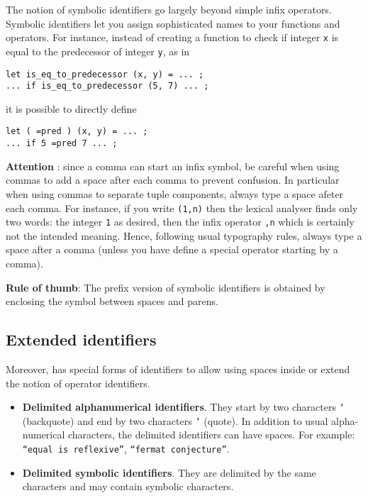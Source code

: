 The {\focal} notion of symbolic identifiers go largely beyond simple
infix operators. Symbolic identifiers let you assign sophisticated names
to your functions and operators.
For instance, instead of creating a function to check if integer {\tt x}
is equal to the predecessor of integer {\tt y}, as in
{\scriptsize
\begin{lstlisting}
let is_eq_to_predecessor (x, y) = ... ;
... if is_eq_to_predecessor (5, 7) ... ;
\end{lstlisting}
}
it is possible to directly define
{\scriptsize
\begin{lstlisting}
let ( =pred ) (x, y) = ... ;
... if 5 =pred 7 ... ;
\end{lstlisting}
}

{\bf Attention} : since a comma can start an infix symbol, be careful
when using commas to add a space after each comma to prevent confusion.
In particular when using commas to separate tuple components, always type
a space afeter each comma. For instance, if you write {\tt (1,n)}
then the lexical analyser finds only two words: the integer {\tt 1} as
desired, then the infix operator {\tt ,n} which is certainly not the
intended meaning. Hence, following usual typography rules, always type a
space after a comma (unless you have define a special operator starting
by a comma).

{\bf Rule of thumb}: The prefix version of symbolic identifiers is obtained by enclosing the
symbol between spaces and parens.

\subsection{Extended identifiers}
\label{extended-identifiers}

Moreover, {\focal} has special forms of identifiers to allow using
spaces inside or extend the notion of operator identifiers.
\begin{itemize}
  \item {\bf Delimited alphanumerical identifiers}.
    They start by two characters {\tt `} (backquote) and end by two
    characters {\tt '} (quote). In addition to usual alpha-numerical
    characters, the delimited identifiers can have spaces. For example:
    {\tt ``equal is reflexive''}, {\tt ``fermat conjecture''}.
  \item {\bf Delimited symbolic identifiers}.
    They are delimited by the same characters and may contain symbolic characters.
\end{itemize}

